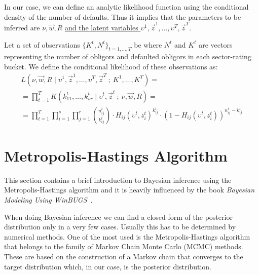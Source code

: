 \documentclass[11pt,fleqn]{book} %
\begin{document}
In our case, we can define an analytic likelihood function using the 
conditional density of the number of defaults. Thus it implies that 
the parameters to be inferred are $\nu,\vec{w},R$ \ul{and the latent 
variables $\upsilon^1,\vec{z}^1,\dots,\upsilon^T,\vec{z}^T$}.

\begin{definition}
	Let a set of observations $\{K^t, N^t\}_{t=1,\dots,T}$ be where $N^t$ 
	and $K^t$ are vectors representing the number of obligors and defaulted 
	obligors in each sector-rating bucket. We define the conditional 
	likelihood of these observations as:
	\begin{displaymath}
		\begin{array}{l}
			L(\nu,\vec{w},R \mid \upsilon^1,\vec{z}^1,\dots,\upsilon^T,\vec{z}^T\ ;\ K^1,\dots,K^T) = \\
			= \displaystyle \prod_{t=1}^T K(k_{11}^t,\dots,k_{sr}^t \mid \upsilon^t,\vec{z}^t\ ;\ \nu,\vec{w},R) = \\
			= \displaystyle
			\prod_{t=1}^T \prod_{i=1}^s \prod_{j=1}^r 
			\binom{n_{ij}^t}{k_{ij}^t} \cdot
			H_{ij}(\upsilon^t,z_i^t)^{k_{ij}^t} \cdot
			\left( 1 - H_{ij}(\upsilon^t,z_i^t) \right)^{n_{ij}^t-k_{ij}^t}
		\end{array}
	\end{displaymath}
\end{definition}

\section{Metropolis-Hastings Algorithm}

This section contains a brief introduction to Bayesian inference using the 
Metropolis-Hastings algorithm and it is heavily influenced by the book 
\emph{Bayesian Modeling Using WinBUGS}~\cite{ntzoufras:2009}.

When doing Bayesian inference we can find a closed-form of the posterior 
distribution only in a very few cases. Usually this has to be determined 
by numerical methods. One of the most used is the Metropolis-Hastings 
algorithm that belongs to the family of Markov Chain Monte Carlo (MCMC) 
methods. These are based on the construction of a Markov chain that converges 
to the target distribution which, in our case, is the posterior distribution.
\end{document}
